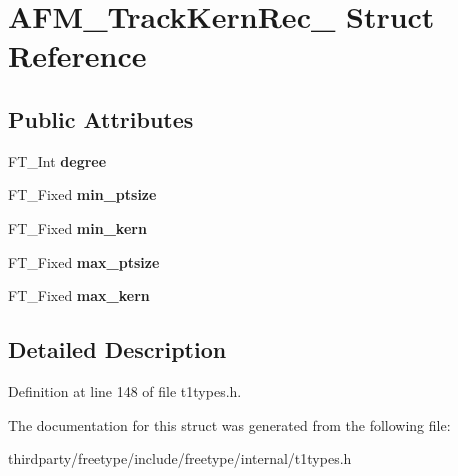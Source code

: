\hypertarget{struct_a_f_m___track_kern_rec__}{}\section{A\+F\+M\+\_\+\+Track\+Kern\+Rec\+\_\+ Struct Reference}
\label{struct_a_f_m___track_kern_rec__}
\subsection*{Public Attributes}
\begin{DoxyCompactItemize}
\item 
\mbox{\label{struct_a_f_m___track_kern_rec___a15272593c1a0ea05ca3687e7c2de26b6}} 
F\+T\+\_\+\+Int {\bfseries degree}
\item 
\mbox{\label{struct_a_f_m___track_kern_rec___a7b1e7fd74d92dcf2b89fee7f74d4fdba}} 
F\+T\+\_\+\+Fixed {\bfseries min\+\_\+ptsize}
\item 
\mbox{\label{struct_a_f_m___track_kern_rec___aee6f40c722e14ee2fb17948ce19d0499}} 
F\+T\+\_\+\+Fixed {\bfseries min\+\_\+kern}
\item 
\mbox{\label{struct_a_f_m___track_kern_rec___a2b22a268fb0654a035ec59d3dfa3dfa4}} 
F\+T\+\_\+\+Fixed {\bfseries max\+\_\+ptsize}
\item 
\mbox{\label{struct_a_f_m___track_kern_rec___a8e25a36b738a2de3fa5c08e477b5a6a2}} 
F\+T\+\_\+\+Fixed {\bfseries max\+\_\+kern}
\end{DoxyCompactItemize}


\subsection{Detailed Description}


Definition at line 148 of file t1types.\+h.



The documentation for this struct was generated from the following file\+:\begin{DoxyCompactItemize}
\item 
thirdparty/freetype/include/freetype/internal/t1types.\+h\end{DoxyCompactItemize}
